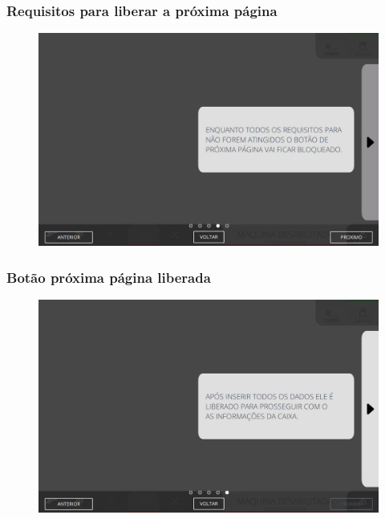 \newpage
\thispagestyle{fancy}
\vspace*{40 pt}
\subsubsection{\small{Requisitos para liberar a próxima página}} \label{sec:telaNovoPedidoP1RequisitosLiberarProximaPagina}
\vspace*{\fill}
\begin{figure}[h]
    \centering
    \includegraphics[width=576 px,height=360 px]{src/imagesICV/09-request/new/e-4-COM-ERRO-DIGITAÇÃO.png}
\end{figure}
\vspace*{\fill}

\newpage
\thispagestyle{fancy}
\vspace*{40 pt}
\subsubsection{\small{Botão próxima página liberada}} \label{sec:telaNovoPedidoP1BotaoProximaPaginaLiberada}
\vspace*{\fill}
\begin{figure}[h]
    \centering
    \includegraphics[width=576 px,height=360 px]{src/imagesICV/09-request/new/e-5.png}
\end{figure}
\vspace*{\fill}

